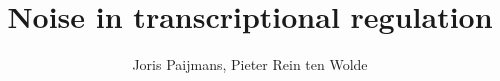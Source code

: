 \documentclass[a4paper,10pt]{article}
\begin{document}
\title{Noise in transcriptional regulation}

\author{Joris Paijmans, Pieter Rein ten Wolde \\ \\ \AMOLF}

\maketitle
\newpage

\tableofcontents





%

\clearpage
\newpage
\appendix
{}




\clearpage
\newpage


\end{document}
